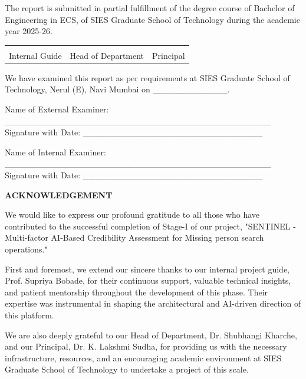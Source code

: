 \documentclass[12pt,a4paper]{report}
\begin{document}
The report is submitted in partial fulfillment of the degree course of Bachelor of Engineering in ECS, of SIES Graduate School of Technology during the academic year 2025-26.

\vspace{2cm}
\noindent
\begin{tabular}{@{}p{4.5cm} p{5.5cm} p{4.5cm}@{}}
\hrulefill & \hrulefill & \hrulefill \\
Internal Guide & Head of Department & Principal
\end{tabular}

\vspace{1.5cm}
We have examined this report as per requirements at SIES Graduate School of Technology, Nerul (E), Navi Mumbai on \_\_\_\_\_\_\_\_\_\_\_\_.

\vspace{1cm}
\noindent
Name of External Examiner: \_\_\_\_\_\_\_\_\_\_\_\_\_\_\_\_\_\_\_\_\_\_\_\_\_\_\_\_\_\_\_\_\_\_\_\_\_\_\_\_\_\_\_ \\
Signature with Date: \_\_\_\_\_\_\_\_\_\_\_\_\_\_\_\_\_\_\_\_\_\_\_\_\_\_\_\_\_

\vspace{1cm}
\noindent
Name of Internal Examiner: \_\_\_\_\_\_\_\_\_\_\_\_\_\_\_\_\_\_\_\_\_\_\_\_\_\_\_\_\_\_\_\_\_\_\_\_\_\_\_\_\_\_\_ \\
Signature with Date: \_\_\_\_\_\_\_\_\_\_\_\_\_\_\_\_\_\_\_\_\_\_\_\_\_\_\_\_\_


\newpage
{}
\begin{center}
\Large \textbf{ACKNOWLEDGEMENT}
\end{center}
\vspace{1cm}
We would like to express our profound gratitude to all those who have contributed to the successful completion of Stage-I of our project, "SENTINEL - Multi-factor AI-Based Credibility Assessment for Missing person search operations."

First and foremost, we extend our sincere thanks to our internal project guide, Prof. Supriya Bobade, for their continuous support, valuable technical insights, and patient mentorship throughout the development of this phase. Their expertise was instrumental in shaping the architectural and AI-driven direction of this platform.

We are also deeply grateful to our Head of Department, Dr. Shubhangi Kharche, and our Principal, Dr. K. Lakshmi Sudha, for providing us with the necessary infrastructure, resources, and an encouraging academic environment at SIES Graduate School of Technology to undertake a project of this scale.
\end{document}
